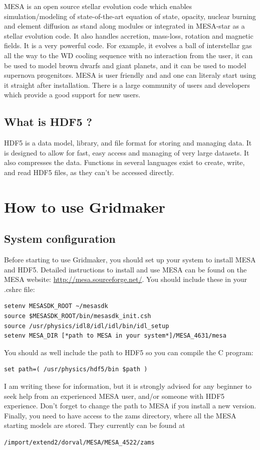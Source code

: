 \documentclass{report}
\begin{document}
MESA is an open source stellar evolution code which enables simulation/modeling of state-of-the-art equation of state, opacity, nuclear burning and element diffusion as stand 
along modules or integrated in MESA-star as a stellar evolution code. It also handles accretion, mass-loss, rotation and magnetic fields.
It is a very powerful code. For example, it evolves a ball of interstellar gas all the way to the WD cooling sequence with no interaction from the user, it can be used to model
 brown dwarfs and giant planets, and it can be used to model supernova progenitors.
MESA is user friendly and and one can literaly start using it straight after installation. There is a large community of users and developers which provide
a good support for new users. 

\section{What is HDF5 ?}
HDF5 is a data model, library, and file format for storing and managing data. It is designed to allow for fast, easy access and managing of very large datasets.
It also compresses the data. Functions in several languages exist to create, write, and read HDF5 files, as they can't be accessed directly.


\chapter{How to use Gridmaker}

\section{System configuration}

Before starting to use Gridmaker, you should set up your system to install MESA and HDF5. Detailed instructions to install and use MESA can be found
on the MESA website: \url{http://mesa.sourceforge.net/}. You should include these in your .cshrc file:
\begin{verbatim}
setenv MESASDK_ROOT ~/mesasdk
source $MESASDK_ROOT/bin/mesasdk_init.csh
source /usr/physics/idl8/idl/idl/bin/idl_setup
setenv MESA_DIR [*path to MESA in your system*]/MESA_4631/mesa
\end{verbatim}
You should as well include the path to HDF5 so you can compile the C program:
\begin{verbatim}
set path=( /usr/physics/hdf5/bin $path )   
\end{verbatim}
I am writing these for information, but it is strongly advised for any beginner to seek help from an experienced MESA user, and/or someone with HDF5 experience. Don't forget to change the path to MESA if you install a new version. Finally, you need to have access to the zams directory, where all the MESA starting models are stored. They currently can be found at 
\begin{verbatim}
/import/extend2/dorval/MESA/MESA_4522/zams
\end{verbatim}
\end{document}
